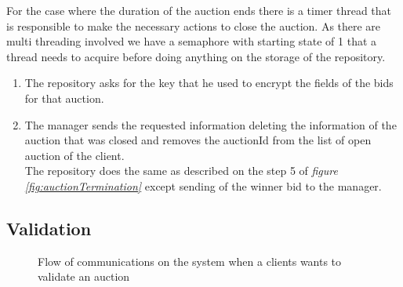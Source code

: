 \documentclass[12pt]{article}
\begin{document}
For the case where the duration of the auction ends there is a timer thread that is responsible
  to make the necessary actions to close the auction. As there are multi threading involved
  we have a semaphore with starting state of 1 that a thread needs to acquire before doing anything
  on the storage of the repository.

\begin{enumerate}
    \item The repository asks for the key that he used to encrypt the fields of the
      bids for that auction.
    \item The manager sends the requested information deleting the information
      of the auction that was closed and removes the auctionId from the list of open auction of the 
      client. \\
      The repository does the same as described on the step 5 of \textit{figure \ref{fig:auctionTermination}} 
      except sending of the winner bid to the manager.

\end{enumerate}

\subsection{Validation}
\label{subsec:auctionValidation}



\begin{figure}[h]
  \caption{Flow of communications on the system when a clients wants to validate an auction}
  \label{fig:auctionValidation}
\end{figure}
\end{document}
